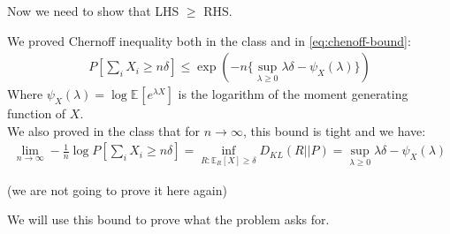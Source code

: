 \documentclass{article}
\numberwithin{equation}{section}
\newcommand{\EX}[2][]{\mathbb{E}_{#1}\left[#2\right]}%
\begin{document}
Now we need to show that LHS \(\ge\) RHS.

We proved Chernoff inequality both in the class and in \eqref{eq:chenoff-bound}:
\begin{align}
\label{eq:chernoff}
P\left[ \sum_i X_i \ge n\delta \right] \le \exp \left( -n \{\sup_{\lambda \ge 0} \lambda\delta - \psi_X(\lambda) \} \right)
\end{align}
Where \(\psi_X(\lambda) = \log \EX{e^{\lambda X}}\) is the logarithm of the moment generating function of \(X\).\\
We also proved in the class that for \(n \to \infty\), this bound is tight and we have:
\begin{align}
\lim_{n\to \infty}-\frac{1}{n}\log P\left[ \sum_i X_i \ge n\delta \right] = \inf_{R: \EX[R]{X} \ge \delta} D_{KL}(R||P) = \sup_{\lambda \ge 0} \lambda\delta - \psi_X(\lambda)
\label{eq:tight-chernoff}
\end{align}

(we are not going to prove it here again)

We will use this bound to prove what the problem asks for.
\end{document}
